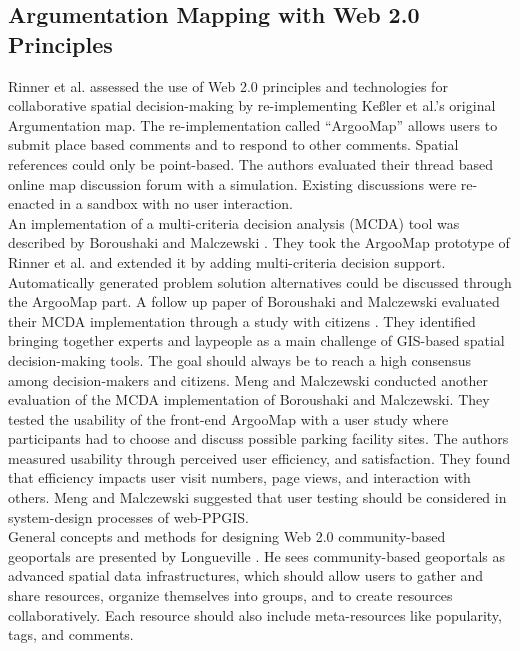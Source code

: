 \subsection{Argumentation Mapping with Web 2.0 Principles}
\label{zweifuenf}
Rinner \cite{Rinner2009_Web2_argumap} et al. assessed the use of Web 2.0 principles and technologies for collaborative spatial decision-making by re-implementing Ke{\ss}ler et al.'s \cite{Kessler2005_ArgumentationMapPrototype} original Argumentation map. The re-implementation called ``ArgooMap'' allows users to submit place based comments and to respond to other comments. Spatial references could only be point-based. The authors evaluated their thread based online map discussion forum with a simulation. Existing discussions were re-enacted in a sandbox with no user interaction.\\
An implementation of a multi-criteria decision analysis (MCDA) tool was described by Boroushaki and Malczewski \cite{Boroushaki2010_ParticipatoryGIS}. They took the ArgooMap prototype of Rinner et al. \cite{Rinner2009_Web2_argumap} and extended it by adding multi-criteria decision support. Automatically generated problem solution alternatives could be discussed through the ArgooMap part. A follow up paper of Boroushaki and Malczewski evaluated their MCDA implementation through a study with citizens \cite{Boroushaki2010_Consensus_measurement}. They identified bringing together experts and laypeople as a main challenge of GIS-based spatial decision-making tools. The goal should always be to reach a high consensus among decision-makers and citizens. Meng and Malczewski \cite{Meng2010_ArgooMap_evaluation} conducted another evaluation of the MCDA implementation of Boroushaki and Malczewski. They tested the usability of the front-end ArgooMap with a user study where participants had to choose and discuss possible parking facility sites. The authors measured usability through perceived user efficiency, and satisfaction. They found that efficiency impacts user visit numbers, page views, and interaction with others. Meng and Malczewski suggested that user testing should be considered in system-design processes of web-PPGIS.\\
General concepts and methods for designing Web 2.0 community-based geoportals are presented by Longueville \cite{Longueville2010_community_based_geoportals_web20}. He sees community-based geoportals as advanced spatial data infrastructures, which should allow users to gather and share resources, organize themselves into groups, and to create resources collaboratively. Each resource should also include meta-resources like popularity, tags, and comments.\\
